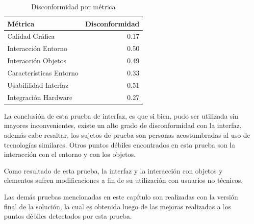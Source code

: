 
\begin{table}[H]
\centering
\begin{tabular}{lr}
\toprule
Métrica & Disconformidad \\
\midrule
Calidad Gráfica         & 0.17 \\
Interacción Entorno     & 0.50\\
Interacción Objetos     & 0.49\\
Características Entorno & 0.33\\
Usabililidad Interfaz   & 0.51\\
Integración Hardware    & 0.27\\
\bottomrule
\end{tabular}
\caption{Disconformidad por métrica}
\label{tab:interfaz_disconformidad_metrica}
\end{table}

La conclusión de esta prueba de interfaz, es que si bien, pudo ser utilizada sin
mayores inconvenientes, existe un alto grado de disconformidad con la interfaz,
además cabe resaltar, los sujetos de prueba son personas acostumbradas al uso de
tecnologías similares. Otros puntos débiles encontrados en esta prueba son la
interacción con el entorno y  con los objetos.

Como resultado de esta prueba, la interfaz y la interacción con objetos y
elementos sufren modificaciones a fin de su utilización con usuarios no
técnicos.

Las demás pruebas mencionadas en este capítulo son realizadas con la versión
final de la solución, la cual es obtenida luego de las mejoras realizadas a los
puntos débiles detectados por esta prueba.
